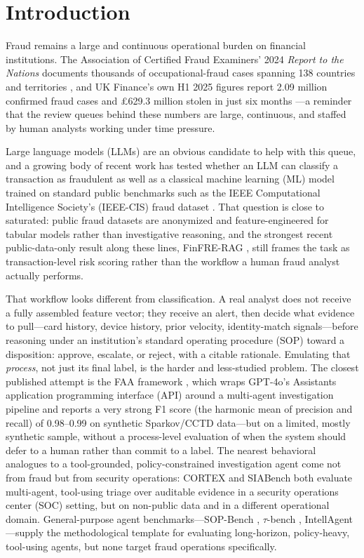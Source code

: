 \documentclass[]{ieeeaccess}
\begin{document}
\section{Introduction}\label{sec:intro}

Fraud remains a large and continuous operational burden on financial
institutions. The Association of Certified Fraud Examiners' 2024
\textit{Report to the Nations} documents thousands of occupational-fraud
cases spanning 138 countries and territories \cite{acfe2024}, and UK
Finance's own H1 2025 figures report 2.09 million confirmed fraud cases
and \pounds 629.3 million stolen in just six months \cite{ukfinance2025}---a reminder that the review queues behind these numbers are large,
continuous, and staffed by human analysts working under time pressure.

Large language models (LLMs) are an obvious candidate to help with this
queue, and a growing body of recent work has tested whether an LLM can classify
a transaction as fraudulent as well as a classical machine learning (ML)
model trained on standard public benchmarks such as the IEEE
Computational Intelligence Society's (IEEE-CIS) fraud dataset
\cite{ieeecis2019}. That question
is close to saturated: public fraud datasets are anonymized and
feature-engineered for tabular models rather than investigative
reasoning, and the strongest recent public-data-only result along these
lines, FinFRE-RAG \cite{finfrerag2025}, still frames the task as
transaction-level risk scoring rather than the workflow a human fraud
analyst actually performs.

That workflow looks different from classification. A real analyst does
not receive a fully assembled feature vector; they receive an alert, then
decide what evidence to pull---card history, device history, prior
velocity, identity-match signals---before reasoning under an
institution's standard operating procedure (SOP) toward a disposition:
approve, escalate, or reject, with a citable rationale. Emulating that
\textit{process}, not just its final label, is the harder and
less-studied problem. The closest published attempt is the FAA framework
\cite{faa2025}, which wraps GPT-4o's Assistants application programming
interface (API) around a multi-agent investigation pipeline and reports
a very strong F1 score (the harmonic mean of precision and recall) of
0.98--0.99 on synthetic Sparkov/CCTD data---but on a limited, mostly
synthetic sample, without a process-level evaluation of when the system
should defer to a human rather than commit to a label. The nearest
behavioral analogues to a tool-grounded, policy-constrained investigation
agent come not from fraud but from security operations: CORTEX
\cite{cortex2025} and SIABench \cite{siabench2026} both evaluate
multi-agent, tool-using triage over auditable evidence in a security
operations center (SOC) setting, but on non-public data and in a
different operational domain. General-purpose agent benchmarks---SOP-Bench \cite{sopbench2025}, $\tau$-bench \cite{taubench2024},
IntellAgent \cite{intellagent2025}---supply the methodological template
for evaluating long-horizon, policy-heavy, tool-using agents, but none
target fraud operations specifically.
\end{document}
